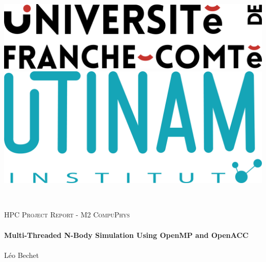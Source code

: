 \documentclass[english,11pt]{article}
\begin{document}
\begin{titlepage}

\begin{center}
        \includegraphics[scale=0.1]{LOGO-UNIV-FC_COULEUR.png}
        \hspace{1cm}
        \includegraphics[scale=0.05]{utinam.png}\\
        \vspace{1cm}
\end{center}\\
    \vbox{ }

    \vbox{ }

    \begin{center}
                
        \textsc{\Large HPC Project Report - M2 CompuPhys}\\[1cm]

        \noindent\makebox[\linewidth]{\rule{.7\paperwidth}{.6pt}}\\[0.7cm]
        { \Huge \bfseries Multi-Threaded N-Body Simulation Using OpenMP and OpenACC}\\[0.25cm]
        \noindent\makebox[\linewidth]{\rule{.7\paperwidth}{.6pt}}\\[0.7cm]
        \LARGE{Léo Bechet}\\[1.2cm]
        

\end{center}
\end{titlepage}
\end{document}
